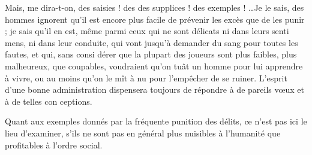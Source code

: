 Mais, me dira-t-on, des saisies ! des
des supplices ! des exemples ! \ldots Je
le sais, des hommes ignorent qu'il
est encore plus facile de prévenir
les excès que de les punir ; je sais
qu'il en est, même parmi ceux qui
ne sont délicats ni dans leurs senti%
mens, ni dans leur conduite, qui
vont jusqu'à demander du sang pour
toutes les fautes, et qui, sans consi%
dérer que la plupart des joueurs sont
plus faibles, plus malheureux, que
coupables, voudraient qu'on tuât
un homme pour lui apprendre à
vivre, ou au moins qu'on le mît à
nu pour l'empêcher de se ruiner.
L'esprit d'une bonne administration
dispensera toujours de répondre à
de pareils v{\oe}ux et à de telles con%
ceptions.

Quant aux exemples donnés par
la fréquente punition des délits, ce
n'est pas ici le lieu d'examiner, s'ils
ne sont pas en général plus nuisibles
à l'humanité que profitables à l'ordre
social.

